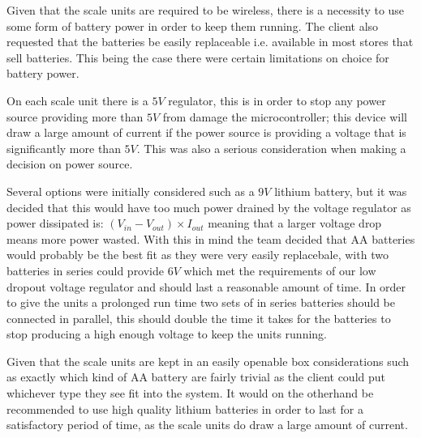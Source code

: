 Given that the scale units are required to be wireless, there is a necessity to use some form of battery power in order to keep them running. The client also requested that the batteries be easily replaceable i.e. available in most stores that sell batteries. This being the case there were certain limitations on choice for battery power. 

On each scale unit there is a $5\unit{V}$ regulator, this is in order to stop any power source providing more than $5\unit{V}$ from damage the microcontroller; this device will draw a large amount of current if the power source is providing a voltage that is significantly more than $5\unit{V}$. This was also a serious consideration when making a decision on power source.

Several options were initially considered such as a $9\unit{V}$ lithium battery, but it was decided that this would have too much power drained by the voltage regulator as power dissipated is: $(V_{in} - V_{out}) \times I_{out}$ meaning that a larger voltage drop means more power wasted. With this in mind the team decided that AA batteries would probably be the best fit as they were very easily replacebale, with two batteries in series could provide $6\unit{V}$ which met the requirements of our low dropout voltage regulator and should last a reasonable amount of time. In order to give the units a prolonged run time two sets of in series batteries should be connected in parallel, this should double the time it takes for the batteries to stop producing a high enough voltage to keep the units running. 

Given that the scale units are kept in an easily openable box considerations such as exactly which kind of AA battery are fairly trivial as the client could put whichever type they see fit into the system. It would on the otherhand be recommended to use high quality lithium batteries in order to last for a satisfactory period of time, as the scale units do draw a large amount of current. 
